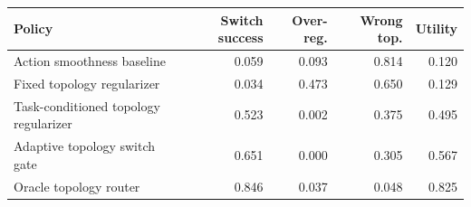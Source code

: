 \begin{tabular}{lrrrr}
\toprule
Policy & Switch success & Over-reg. & Wrong top. & Utility \\
\midrule
Action smoothness baseline & 0.059 & 0.093 & 0.814 & 0.120 \\
Fixed topology regularizer & 0.034 & 0.473 & 0.650 & 0.129 \\
Task-conditioned topology regularizer & 0.523 & 0.002 & 0.375 & 0.495 \\
Adaptive topology switch gate & 0.651 & 0.000 & 0.305 & 0.567 \\
Oracle topology router & 0.846 & 0.037 & 0.048 & 0.825 \\
\bottomrule
\end{tabular}
